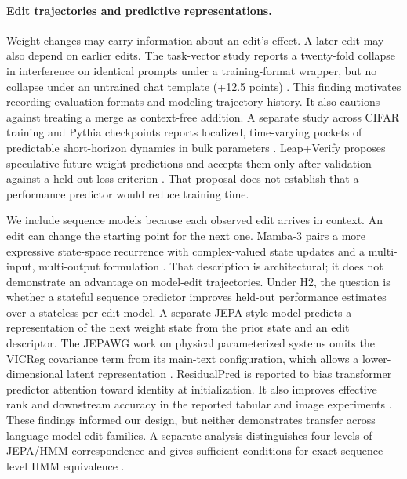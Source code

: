\paragraph{Edit trajectories and predictive representations.}
Weight changes may carry information about an edit's effect. A later edit may also depend on earlier edits. The task-vector study reports a twenty-fold collapse in interference on identical prompts under a training-format wrapper, but no collapse under an untrained chat template (+12.5 points) \citep{taskvectors2026interfere}. This finding motivates recording evaluation formats and modeling trajectory history. It also cautions against treating a merge as context-free addition. A separate study across CIFAR training and Pythia checkpoints reports localized, time-varying pockets of predictable short-horizon dynamics in bulk parameters \citep{predictability2026dynamics}. Leap+Verify proposes speculative future-weight predictions and accepts them only after validation against a held-out loss criterion \citep{leapverify2026}. That proposal does not establish that a performance predictor would reduce training time.

We include sequence models because each observed edit arrives in context. An edit can change the starting point for the next one. Mamba-3 pairs a more expressive state-space recurrence with complex-valued state updates and a multi-input, multi-output formulation \citep{mamba3}. That description is architectural; it does not demonstrate an advantage on model-edit trajectories. Under H2, the question is whether a stateful sequence predictor improves held-out performance estimates over a stateless per-edit model. A separate JEPA-style model predicts a representation of the next weight state from the prior state and an edit descriptor. The JEPAWG work on physical parameterized systems omits the VICReg covariance term from its main-text configuration, which allows a lower-dimensional latent representation \citep{jepawg2026physics}. ResidualPred is reported to bias transformer predictor attention toward identity at initialization. It also improves effective rank and downstream accuracy in the reported tabular and image experiments \citep{drivedecay2026}. These findings informed our design, but neither demonstrates transfer across language-model edit families. A separate analysis distinguishes four levels of JEPA/HMM correspondence and gives sufficient conditions for exact sequence-level HMM equivalence \citep{jepahmm2026}.

